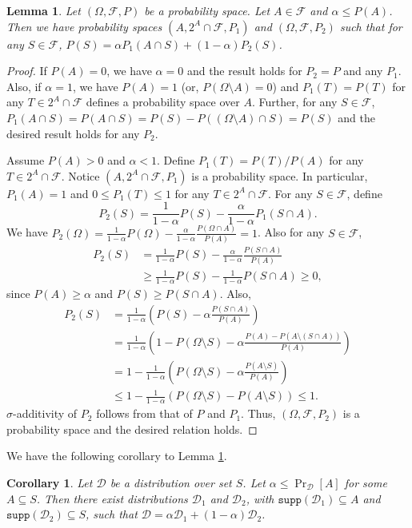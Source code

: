 \documentclass[11pt]{article}
\newtheorem{lemma}[theorem]{Lemma}
\newtheorem{corollary}[theorem]{Corollary}
\newcommand{\0}{\mathbf{0}}
\newcommand{\1}{\mathbf{1}}
\newcommand{\cD}{\mathcal{D}}
\newcommand{\cF}{\mathcal{F}}
\begin{document}
\begin{lemma}\label{lem:redistribution}
Let $(\Omega,\cF,P)$ be a probability space. Let $A\in\cF$ and $\alpha\le P(A)$. Then we have probability spaces $(A,2^A\cap \cF,P_1)$ and $(\Omega,\cF,P_2)$ such that for any $S\in\cF$, $P(S)=\alpha P_1(A\cap S)+(1-\alpha)P_2(S)$.
\end{lemma}
\begin{proof}
If $P(A)=0$, we have $\alpha=0$ and the result holds for $P_2=P$ and any $P_1$. Also, if $\alpha=1$, we have $P(A)=1$ (or, $P(\Omega\setminus A)=0$) and $P_1(T)=P(T)$ for any $T\in 2^A\cap \cF$ defines a probability space over $A$. Further, for any $S\in\cF$, $P_1(A\cap S)=P(A\cap S)=P(S)-P((\Omega\setminus A)\cap S)=P(S)$ and the desired result holds for any $P_2$.

Assume $P(A)>0$ and $\alpha<1$. Define $P_1(T)=P(T)/P(A)$ for any $T\in 2^A\cap \cF$. Notice $(A,2^A\cap \cF,P_1)$ is a probability space. In particular, $P_1(A)=1$ and $0\le P_1(T)\le 1$ for any $T\in 2^A\cap \cF$. For any $S\in\cF$, define
$$P_2(S)=\frac{1}{1-\alpha}P(S)-\frac{\alpha}{1-\alpha}P_1(S\cap A).$$
We have $P_2(\Omega)=\frac{1}{1-\alpha}P(\Omega)-\frac{\alpha}{1-\alpha}\frac{P(\Omega\cap A)}{P(A)}=1$. Also for any $S\in\cF$,
\begin{align*}
    P_2(S)&=\frac{1}{1-\alpha}P(S)-\frac{\alpha}{1-\alpha}\frac{P(S\cap A)}{P(A)}\\
    &\ge \frac{1}{1-\alpha}P(S)-\frac{1}{1-\alpha}P(S\cap A)\ge 0,
\end{align*}
since $P(A)\ge\alpha$ and $P(S)\ge P(S\cap A)$. Also,
\begin{align*}
    P_2(S)&=\frac{1}{1-\alpha}\left(P(S)-\alpha\frac{P(S\cap A)}{P(A)}\right)\\
    &= \frac{1}{1-\alpha}\left(1-P(\Omega\setminus S)-\alpha\frac{P(A)-P(A\setminus (S\cap A))}{P(A)}\right)\\
    &=1-\frac{1}{1-\alpha}\left(P(\Omega\setminus S)-\alpha\frac{P(A\setminus S)}{P(A)}\right)\\
    &\le 1-\frac{1}{1-\alpha}\left(P(\Omega\setminus S)-P(A\setminus S)\right)\le 1.
\end{align*}
$\sigma$-additivity of $P_2$ follows from that of $P$ and $P_1$. Thus, $(\Omega,\cF,P_2)$ is a probability space and the desired relation holds.
\end{proof}

We have the following corollary to Lemma \ref{lem:redistribution}.


\begin{corollary}\label{cor:redistribution}
Let $\cD$ be a distribution over set $S$. Let $\alpha\le\Pr_\cD[A]$ for some $A\subseteq S$. Then there exist distributions $\cD_1$ and $\cD_2$, with $\texttt{supp}(\cD_1)\subseteq A$ and $\texttt{supp}(\cD_2)\subseteq S$, such that $\cD=\alpha \cD_1+(1-\alpha)\cD_2$.
\end{corollary}
\end{document}
